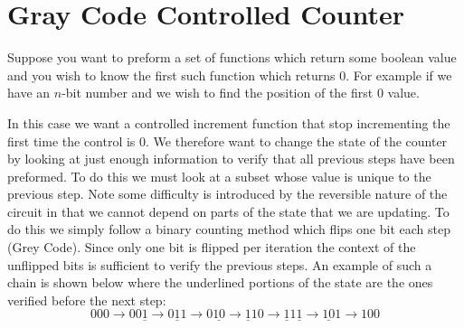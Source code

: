 \section{Gray Code Controlled Counter\label{sec:findFirst}}
  Suppose you want to preform a set of functions which return some boolean value and you wish to know the first such function which returns $0$.
  For example if we have an $n$-bit number and we wish to find the position of the first $0$ value.

  In this case we want a controlled increment function that stop incrementing the first time the control is $0$.
  We therefore want to change the state of the counter by looking at just enough information to verify that all previous steps have been preformed.
  To do this we must look at a subset whose value is unique to the previous step.
  Note some difficulty is introduced by the reversible nature of the circuit in that we cannot depend on parts of the state that we are updating.
  To do this we simply follow a binary counting method which flips one bit each step (Grey Code).
  Since only one bit is flipped per iteration the context of the unflipped bits is sufficient to verify the previous steps.
  An example of such a chain is shown below where the underlined portions of the state are the ones verified before the next step:
  \[
    000 \to 00\underline{1} \to 0\underline{1}1 \to 0\underline{10} \to \underline{1}10 \to
    \underline{1}1\underline{1} \to \underline{10}1 \to 100
  \]
